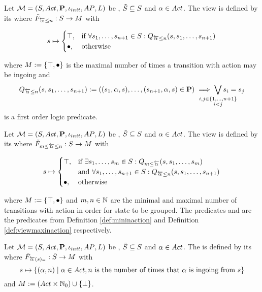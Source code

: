 \documentclass[preview]{standalone}
\begin{document}
\begin{definition}
	Let $\chgph = \chgphtuple$ be \achgphN, $\smstates \subseteq \states$ and $\action \in \actions$. The view \viewmaxinaction is defined by its \grpfctN where $\gfctsubmaxinaction : \states \to \arbset$ with
	
	\[
	\state \mapsto
	\begin{cases}
			\group,				& \text{if } \forall \state_1, \dots, \state_{\numinact+1} \in \states: \predmaxinact \\
			\remelem,          	& \text{otherwise}
		\end{cases}
	\]
	
	where $\imggrp := \imggrpbinview$
	 is the maximal number of times a transition with action \action may be ingoing and 
	\[
	\predmaxinact := ((\state_1, \action, \state), \dots, (\state_{\numinact+1}, \action, \state) \in \trans) \implies \bigvee_{\mathclap{\substack{i,j \in \{1,\dots, \numinact+1\} \\ i < j}}} \state_i = \state_j
	\]
	is a first order logic predicate.
\end{definition}

\begin{definition}
	Let $\chgph = \chgphtuple$ be \achgphN, $\smstates \subseteq \states$ and $\action \in \actions$. The view 
	\viewspaninaction is defined by its \grpfctN where $\gfctsubspaninaction : \states \to \arbset$ with
	
	\[
	\state \mapsto
	\begin{cases}
			\group,				& \text{if } \exists \state_1, \dots, \state_\numinactb \in \states: \predmininact[\numinactb] \\ &\text{and } \forall \state_1, \dots, \state_{\numinact+1} \in \states: \predmaxinact \\
			\remelem,          	& \text{otherwise}
		\end{cases}
	\]
	
	where $\imggrp := \imggrpbinview$
	and $\numinactb, \numinact \in \natnums$ are the minimal and maximal number of transitions with action \action in order for state to be grouped. The predicates \predmininact and \predmaxinact are the predicates from Definition \ref{def:mininaction} and Definition \ref{def:viewmaxinaction} respectively.
\end{definition}

\begin{definition}
	Let $\chgph = \chgphtuple$ be \achgphN, $\smstates \subseteq \states$ and $\action \in \actions$. The \viewN \viewstronginactident is defined by its \grpfctN where $\gfctsubstronginactident : \smstates \to \imggrp$ with
	\[
	\state \mapsto	
	\{(\action, \numinact) \mid \action \in \actions, \numinact \text{ is the number of times that \action is ingoing from } \state\}
	\]
	and $\imggrp := (\actions \times \natnums_0) \cup \remset$.
\end{definition}
\end{document}
